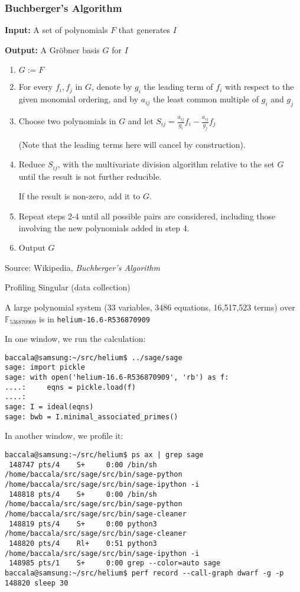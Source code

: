 \documentclass[11pt]{beamer}
\begin{document}
\begin{frame}
\frametitle{Buchberger's Algorithm}

{\bf Input:} A set of polynomials $F$ that generates $I$

{\bf Output:} A Gröbner basis $G$ for $I$

\begin{enumerate}
\item $G := F$
\item For every $f_i,f_j$ in $G$, denote by $g_i$ the leading term of $f_i$ with respect to the given monomial ordering,
and by $a_{ij}$ the least common multiple of $g_i$ and $g_j$
\item Choose two polynomials in $G$ and let $S_{ij}=\frac{a_{ij}}{g_i}f_i  - \frac{a_{ij}}{g_j}f_j $

(Note that the leading terms here will cancel by construction).
\item Reduce $S_{ij}$, with the multivariate division algorithm relative to the set $G$ until the result is not further reducible.

If the result is non-zero, add it to $G$.
\item Repeat steps 2-4 until all possible pairs are considered, including those involving the new polynomials added in step 4.
\item Output $G$
\end{enumerate}

Source: Wikipedia, {\it Buchberger's Algorithm}
\end{frame}

\begin{frame}[fragile]{Profiling Singular (data collection)}

A large polynomial system (33 variables, 3486 equations, 16,517,523 terms) over $\mathbb{F}_{536870909}$ is in {\tt helium-16.6-R536870909}

\vskip 12pt

In one window, we run the calculation:

{\tiny\begin{verbatim}
baccala@samsung:~/src/helium$ ../sage/sage
sage: import pickle
sage: with open('helium-16.6-R536870909', 'rb') as f:
....:     eqns = pickle.load(f)
....: 
sage: I = ideal(eqns)
sage: bwb = I.minimal_associated_primes()
\end{verbatim}}

In another window, we profile it:

{\tiny\begin{verbatim}
baccala@samsung:~/src/helium$ ps ax | grep sage
 148747 pts/4    S+     0:00 /bin/sh /home/baccala/src/sage/src/bin/sage-python /home/baccala/src/sage/src/bin/sage-ipython -i
 148818 pts/4    S+     0:00 /bin/sh /home/baccala/src/sage/src/bin/sage-python /home/baccala/src/sage/src/bin/sage-cleaner
 148819 pts/4    S+     0:00 python3 /home/baccala/src/sage/src/bin/sage-cleaner
 148820 pts/4    Rl+    0:51 python3 /home/baccala/src/sage/src/bin/sage-ipython -i
 148985 pts/1    S+     0:00 grep --color=auto sage
baccala@samsung:~/src/helium$ perf record --call-graph dwarf -g -p 148820 sleep 30
\end{verbatim}}
\end{frame}
\end{document}

